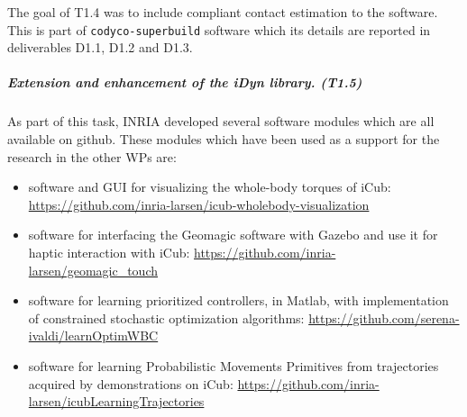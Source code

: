 The goal of T1.4 was to include compliant contact estimation to the software.
This is part of \texttt{codyco-superbuild} software which its details are
reported in deliverables D1.1, D1.2 and D1.3.


\subparagraph*{Extension and enhancement of the iDyn library. (T1.5)}

As part of this task, INRIA developed several software modules which are all
available on github.  These modules which have been used as a support for the
research in the other WPs are:
\begin{itemize}
  \item software and GUI for visualizing the whole-body torques of iCub:
    \url{https://github.com/inria-larsen/icub-wholebody-visualization}
  \item software for interfacing the Geomagic software with Gazebo and use it
    for haptic interaction with iCub:
    \url{https://github.com/inria-larsen/geomagic_touch}
  \item software for learning prioritized controllers, in Matlab, with
    implementation of constrained stochastic optimization algorithms:
    \url{https://github.com/serena-ivaldi/learnOptimWBC}
  \item software for learning Probabilistic Movements Primitives from
    trajectories acquired by demonstrations on iCub:
    \url{https://github.com/inria-larsen/icubLearningTrajectories}
\end{itemize}


